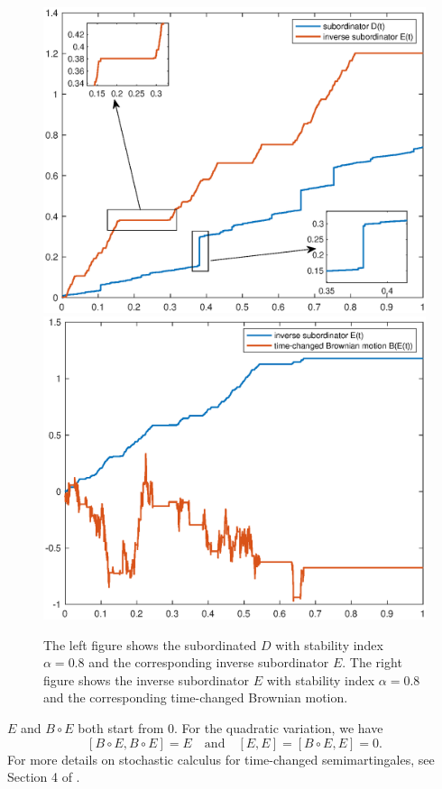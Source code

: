 \documentclass[10pt,reqno,final]{amsart}
\theoremstyle{plain}
\theoremstyle{definition}
\theoremstyle{remark}
\numberwithin{equation}{section}
\numberwithin{figure}{section}
\numberwithin{table}{section}
\begin{document}
\begin{figure}[htp!]
	\centering
	\includegraphics[width=0.45\linewidth]{DE.eps}
	\hfill
	\includegraphics[width=0.45\linewidth]{BE.eps}
	\caption{The left figure shows the subordinated $D$ with stability index $\alpha = 0.8$ and the corresponding inverse subordinator $E$. The right figure shows the inverse subordinator $E$ with stability index $\alpha = 0.8$ and the corresponding time-changed Brownian motion.
	}
	\label{fig:image1}
	\vspace{-2ex}
\end{figure}

\( E \) and \( B \circ E \) both start from 0. For the quadratic variation, we have
$$
[B \circ E, B \circ E] = E \quad \text{and} \quad [E, E] = [B \circ E, E] = 0.
$$
For more details on stochastic calculus for time-changed semimartingales, see Section 4 of \cite{kobayashi2011stochastic}.
\end{document}
